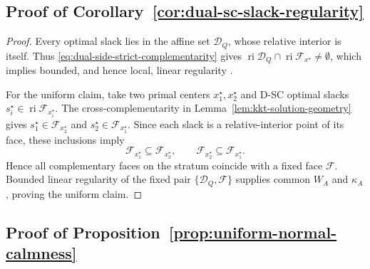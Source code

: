 \documentclass[letterpaper]{article} %
\theoremstyle{definition}
\theoremstyle{remark}
\begin{document}
\subsection{Proof of Corollary~\ref{cor:dual-sc-slack-regularity}}
\label{app:proof-dual-sc-slack-regularity}

\begin{proof}
Every optimal slack lies in the affine set $\mathcal D_Q$, whose relative
interior is itself.  Thus \eqref{eq:dual-side-strict-complementarity} gives
$\operatorname{ri}\mathcal D_Q\cap
\operatorname{ri}\mathcal F_{x^\star}\neq\emptyset$, which implies bounded,
and hence local, linear regularity \cite{bauschke1999strong}.

For the uniform claim, take two primal centers $x_1^\star,x_2^\star$ and
D-SC optimal slacks
$s_i^\star\in\operatorname{ri}\mathcal F_{x_i^\star}$.  The
cross-complementarity in Lemma~\ref{lem:kkt-solution-geometry} gives
$s_1^\star\in\mathcal F_{x_2^\star}$ and
$s_2^\star\in\mathcal F_{x_1^\star}$.  Since each slack is a
relative-interior point of its face, these inclusions imply
\[
    \mathcal F_{x_1^\star}\subseteq\mathcal F_{x_2^\star},
    \qquad
    \mathcal F_{x_2^\star}\subseteq\mathcal F_{x_1^\star}.
\]
Hence all complementary faces on the stratum coincide with a fixed face
$\mathcal F$.  Bounded linear regularity of the fixed pair
$\{\mathcal D_Q,\mathcal F\}$ supplies common $W_A$ and $\kappa_A$, proving
the uniform claim.
\end{proof}

\subsection{Proof of Proposition~\ref{prop:uniform-normal-calmness}}
\label{app:proof-uniform-normal-calmness}
\end{document}
